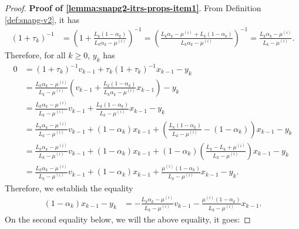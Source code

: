 \documentclass[12pt]{article}
\begin{document}
    \begin{proof}
        \textbf{Proof of \ref{lemma:snapg2-itrs-props-item1}}. 
        From Definition \ref{def:snapg-v2}, it has
        \begin{align*}
            (1 + \tau_k)^{-1}
            &=
            \left(
                1 + \frac{L_k(1 - \alpha_k)}{L_k\alpha_k - \mu^{(i)}}
            \right)^{-1} = \left(
                \frac{L_k\alpha_k - \mu^{(i)} + L_k(1 - \alpha_k)}{L_k\alpha_k - \mu^{(i)}}
            \right)^{-1}
            = \frac{L_k\alpha_k - \mu^{(i)}}{L_k - \mu^{(i)}}. 
        \end{align*}
        Therefore, for all $k \ge 0$, $y_k$ has 
        \begin{align*}
            0 &= (1 + \tau_k)^{-1} v_{k - 1} + \tau_k (1 + \tau_k)^{-1} x_{k - 1} - y_k
            \\
            &= \frac{L_k\alpha_k - \mu^{(i)}}{L_k - \mu^{(i)}} 
            \left(
                v_{k - 1} + \frac{L_k(1 - \alpha_k)}{L_k\alpha_k - \mu^{(i)}} x_{k - 1}
            \right) - y_k
            \\
            &= \frac{L_k\alpha_k - \mu^{(i)}}{L_k - \mu^{(i)}} v_{k - 1}
            + \frac{L_k(1 - \alpha_k)}{L_k - \mu^{(i)}} x_{k - 1} - y_k
            \\
            &= \frac{L_k\alpha_k - \mu^{(i)}}{L_k - \mu^{(i)}} v_{k - 1} + (1 - \alpha_k)x_{k - 1}
            + 
            \left(
                \frac{L_k(1 - \alpha_k)}{L_k - \mu^{(i)}} - (1 - \alpha_k)
            \right) x_{k - 1} - y_k
            \\
            &= \frac{L_k\alpha_k - \mu^{(i)}}{L_k - \mu^{(i)}} v_{k - 1} + (1 - \alpha_k)x_{k - 1}
            + 
            (1 - \alpha_k)\left(
                \frac{L_k - L_k + \mu^{(i)}}{L_k - \mu^{(i)}}
            \right) x_{k - 1} - y_k
            \\
            &= \frac{L_k\alpha_k - \mu^{(i)}}{L_k - \mu^{(i)}} v_{k - 1} + (1 - \alpha_k)x_{k - 1}
            + 
            \frac{\mu^{(i)}(1 - \alpha_k)}{L_k - \mu^{(i)}}x_{k - 1} - y_k. 
        \end{align*}
        Therefore, we establish the equality 
        \begin{align*}
            (1 - \alpha_k)x_{k - 1} - y_k &= 
            - \frac{L_k\alpha_k - \mu^{(i)}}{L_k - \mu^{(i)}} v_{k - 1} 
            - \frac{\mu^{(i)}(1 - \alpha_k)}{L_k - \mu^{(i)}} x_{k - 1}. 
        \end{align*}
        On the second equality below, we will the above equality, it goes: 

\end{proof}
\end{document}
